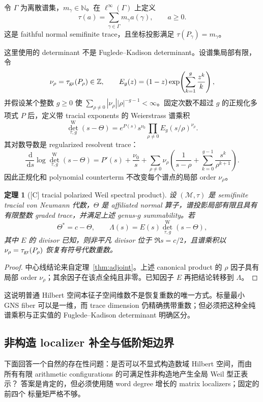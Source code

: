 \documentclass[UTF8,11pt,a4paper]{ctexart}
\newtheorem{theorem}{定理}[section]
\theoremstyle{definition}
\theoremstyle{remark}
\newcommand{\N}{\mathbb N}
\newcommand{\dd}{\,\mathrm d}
\newcommand{\1}{\mathbf 1}
\newcommand{\cM}{\mathcal M}
\newcommand{\statusC}{\textnormal{[C]}}
\begin{document}
令 $\Gamma$ 为离散谱集，$m_\gamma\in\N$。在 $\ell^\infty(\Gamma)$ 上定义
\[
  \tau(a)=\sum_{\gamma\in\Gamma}m_\gamma a(\gamma),\qquad a\geq0.
\]
这是 faithful normal semifinite trace，且坐标投影满足 $\tau(P_\gamma)=m_\gamma$。

这里使用的 determinant 不是 Fuglede--Kadison determinant。设谱集局部有限，令
\[
 \nu_\rho=\tau_{\rm gr}(P_\rho)\in\mathbb Z,
 \qquad
 E_g(z)=(1-z)\exp\!\left(\sum_{k=1}^{g}\frac{z^k}{k}\right),
\]
并假设某个整数 $g\geq0$ 使
$\sum_{\rho\ne0}|\nu_\rho||\rho|^{-g-1}<\infty$。固定次数不超过 $g$ 的正规化多项式 $P$ 后，定义带 tracial exponents 的 Weierstrass 谱乘积
\[
 \det^{\mathrm W}_{\tau,g}(s-\Theta)
 =e^{P(s)}s^{\nu_0}\prod_{\rho\ne0}E_g(s/\rho)^{\nu_\rho}.
\]
其对数导数是 regularized resolvent trace：
\[
 \frac{\dd}{\dd s}\log\det^{\mathrm W}_{\tau,g}(s-\Theta)
 =P'(s)+\frac{\nu_0}{s}
  +\sum_{\rho\ne0}\nu_\rho
   \left(\frac1{s-\rho}+\sum_{k=0}^{g-1}\frac{s^k}{\rho^{k+1}}\right).
\]
因此正规化和 polynomial counterterm 不改变每个谱点的局部 order $\nu_\rho$。

\begin{theorem}[\statusC{} tracial polarized Weil spectral product]
设 $(\cM,\tau)$ 是 semifinite tracial von Neumann 代数，$\Theta$ 是 affiliated normal 算子，谱投影局部有限且具有有限整数 graded trace，并满足上述 genus-$g$ summability。若
\[
  \Theta^*=c-\Theta,\qquad
  \Lambda(s)=E(s)\det^{\mathrm W}_{\tau,g}(s-\Theta),
\]
其中 $E$ 的 divisor 已知，则非平凡 divisor 位于 $\Re s=c/2$，且谱乘积以 $\nu_\rho=\tau_{\rm gr}(P_\rho)$ 恢复有符号代数重数。
\end{theorem}

\begin{proof}
中心线结论来自定理~\ref{thm:adjoint}。上述 canonical product 的 $\rho$ 因子具有局部 order $\nu_\rho$；其余因子在该点全纯且非零。已知因子 $E$ 再把结论转移到 $\Lambda$。
\end{proof}

这说明普通 Hilbert 空间本征子空间维数不是恢复重数的唯一方式。标量最小 GNS fiber 可以是一维，而 trace dimension 仍精确携带重数；但必须把这种全纯谱乘积与正实值的 Fuglede--Kadison determinant 明确区分。

\subsection{非构造 localizer 补全与低阶矩边界}

下面回答一个自然的存在性问题：是否可以不显式构造数域 Hilbert 空间，而由
所有有限 arithmetic configurations 的可满足性非构造地产生全局 Weil 型正表示？
答案是肯定的，但必须使用随 word degree 增长的 matrix localizers；固定的前四个
标量矩严格不够。
\end{document}
